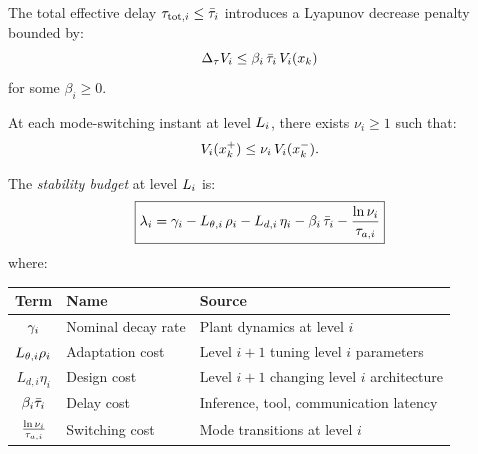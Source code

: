 \documentclass[11pt,a4paper]{article}
\begin{document}
\begin{assumption}
\label{ass:delay}
The total effective delay $\tau_{\text{tot},i} \leq \bar{\tau}_i$ introduces a
Lyapunov decrease penalty bounded by:
\begin{equation}
  \Delta_\tau V_{i} \leq \beta_i \, \bar{\tau}_i \, V_{i}(x_k)
\end{equation}
for some $\beta_i \geq 0$.
\end{assumption}

\begin{assumption}
\label{ass:jump}
At each mode-switching instant at level $L_{i}$, there exists $\nu_i \geq 1$
such that:
\begin{equation}
  V_{i}(x_k^+) \leq \nu_i \, V_{i}(x_k^-).
\end{equation}
\end{assumption}

\begin{definition}
\label{def:budget}
The \emph{stability budget} at level $L_{i}$ is:
\begin{equation}
  \boxed{
  \stab_i
  = \decay_i
  - L_{\param,i} \, \rho_i
  - L_{d,i} \, \eta_i
  - \beta_i \, \taubar_i
  - \frac{\ln \nu_i}{\taua[i]}
  }
  \label{eq:budget}
\end{equation}
where:
\begin{center}
\begin{tabular}{@{}cll@{}}
  \toprule
  \textbf{Term} & \textbf{Name} & \textbf{Source} \\
  \midrule
  $\gamma_i$ & Nominal decay rate & Plant dynamics at level $i$ \\
  $L_{\theta,i} \rho_i$ & Adaptation cost & Level $i{+}1$ tuning level $i$ parameters \\
  $L_{d,i} \eta_i$ & Design cost & Level $i{+}1$ changing level $i$ architecture \\
  $\beta_i \bar{\tau}_i$ & Delay cost & Inference, tool, communication latency \\
  $\frac{\ln \nu_i}{\taua[i]}$ & Switching cost & Mode transitions at level $i$ \\
  \bottomrule
\end{tabular}
\end{center}
\end{definition}
\end{document}
